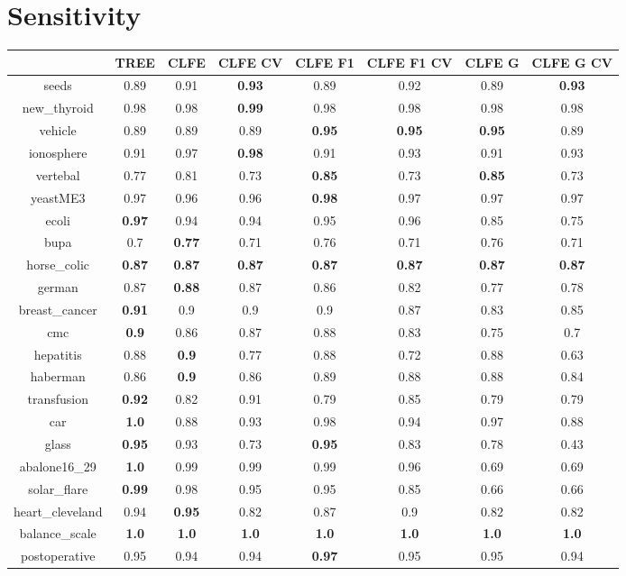 \documentclass{article}%
\begin{document}
%
\section*{Sensitivity}%
\begin{tabular}{c|ccccccc}%
\hline%
&TREE&CLFE&CLFE CV&CLFE F1&CLFE F1 CV&CLFE G&CLFE G CV\\%
\hline%
seeds&0.89&0.91&\textbf{0.93}&0.89&0.92&0.89&\textbf{0.93}\\%
new\_thyroid&0.98&0.98&\textbf{0.99}&0.98&0.98&0.98&0.98\\%
vehicle&0.89&0.89&0.89&\textbf{0.95}&\textbf{0.95}&\textbf{0.95}&0.89\\%
ionosphere&0.91&0.97&\textbf{0.98}&0.91&0.93&0.91&0.93\\%
vertebal&0.77&0.81&0.73&\textbf{0.85}&0.73&\textbf{0.85}&0.73\\%
yeastME3&0.97&0.96&0.96&\textbf{0.98}&0.97&0.97&0.97\\%
ecoli&\textbf{0.97}&0.94&0.94&0.95&0.96&0.85&0.75\\%
bupa&0.7&\textbf{0.77}&0.71&0.76&0.71&0.76&0.71\\%
horse\_colic&\textbf{0.87}&\textbf{0.87}&\textbf{0.87}&\textbf{0.87}&\textbf{0.87}&\textbf{0.87}&\textbf{0.87}\\%
german&0.87&\textbf{0.88}&0.87&0.86&0.82&0.77&0.78\\%
breast\_cancer&\textbf{0.91}&0.9&0.9&0.9&0.87&0.83&0.85\\%
cmc&\textbf{0.9}&0.86&0.87&0.88&0.83&0.75&0.7\\%
hepatitis&0.88&\textbf{0.9}&0.77&0.88&0.72&0.88&0.63\\%
haberman&0.86&\textbf{0.9}&0.86&0.89&0.88&0.88&0.84\\%
transfusion&\textbf{0.92}&0.82&0.91&0.79&0.85&0.79&0.79\\%
car&\textbf{1.0}&0.88&0.93&0.98&0.94&0.97&0.88\\%
glass&\textbf{0.95}&0.93&0.73&\textbf{0.95}&0.83&0.78&0.43\\%
abalone16\_29&\textbf{1.0}&0.99&0.99&0.99&0.96&0.69&0.69\\%
solar\_flare&\textbf{0.99}&0.98&0.95&0.95&0.85&0.66&0.66\\%
heart\_cleveland&0.94&\textbf{0.95}&0.82&0.87&0.9&0.82&0.82\\%
balance\_scale&\textbf{1.0}&\textbf{1.0}&\textbf{1.0}&\textbf{1.0}&\textbf{1.0}&\textbf{1.0}&\textbf{1.0}\\%
postoperative&0.95&0.94&0.94&\textbf{0.97}&0.95&0.95&0.94\\%
\end{tabular}
\end{document}
